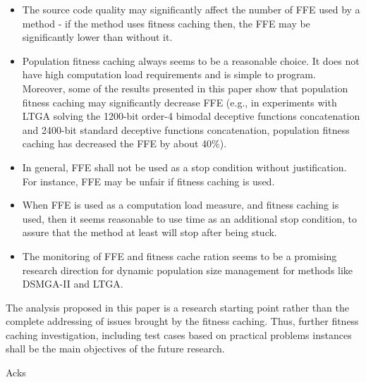 \begin{itemize}
	\item The source code quality may significantly affect the number of FFE used by a method - if the method uses fitness caching then, the FFE may be significantly lower than without it.
	\item Population fitness caching always seems to be a reasonable choice. It does not have high computation load requirements and is simple to program. Moreover, some of the results presented in this paper show that population fitness caching may significantly decrease FFE (e.g., in experiments with LTGA solving the 1200-bit order-4 bimodal deceptive functions concatenation and 2400-bit standard deceptive functions concatenation, population fitness caching has decreased the FFE by about 40\%).
	\item In general, FFE shall not be used as a stop condition without justification. For instance, FFE may be unfair if fitness caching is used.
	\item When FFE is used as a computation load measure, and fitness caching is used, then it seems reasonable to use time as an additional stop condition, to assure that the method at least will stop after being stuck.
	\item The monitoring of FFE and fitness cache ration seems to be a promising research direction for dynamic population size management for methods like DSMGA-II and LTGA.
\end{itemize}

The analysis proposed in this paper is a research starting point rather than the complete addressing of issues brought by the fitness caching. Thus, further fitness caching investigation, including test cases based on practical problems instances shall be the main objectives of the future research.


\begin{acks}
	Acks
\end{acks}
